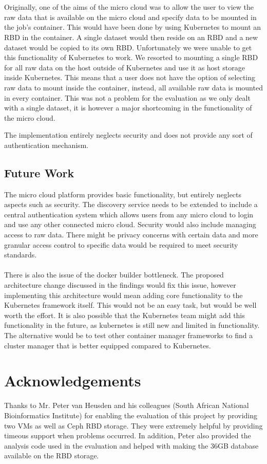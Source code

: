 \documentclass{sig-alternate-05-2015}
\begin{document}
\\\\
Originally, one of the aims of the micro cloud was to allow the user to view the raw data that is available
on the micro cloud and specify data to be mounted in the job's container. This would have been done by using Kubernetes to mount an RBD in the container. A single dataset would then reside on an RBD and a new dataset would be copied to its own RBD. Unfortunately we were unable to get this functionality of Kubernetes to work. We resorted to mounting a single RBD for all raw data on the host outside of Kubernetes and use it as host storage inside Kubernetes. This means that a user does not have the option of selecting raw data to mount inside the container, instead, all available raw data is mounted in every container. This was not a problem for the evaluation as we only dealt with a single dataset, it is however a major shortcoming in the functionality of the micro cloud. 



The implementation entirely neglects security and does not provide any sort of authentication mechanism.




\subsection{Future Work}
The micro cloud platform provides basic functionality, but entirely neglects aspects such as security. The discovery service needs to be extended to include a central authentication system which allows users from any micro cloud to login and use any other connected micro cloud. Security would also include managing access to raw data. There might be privacy concerns with certain data and more granular access control to specific data would be required to meet security standards.
\\\\
There is also the issue of the docker builder bottleneck. The proposed architecture change discussed in the findings would fix this issue, however implementing this architecture would mean adding core functionality to the Kubernetes framework itself. This would not be an easy task, but would be well worth the effort. It is also possible that the Kubernetes team might add this functionality in the future, as kubernetes is still new and limited in functionality. The alternative would be to test other container manager frameworks to find a cluster manager that is better equipped compared to Kubernetes.

\section{Acknowledgements}
Thanks to Mr. Peter van Heusden and his colleagues (South African National Bioinformatics Institute) for enabling the evaluation of this project by providing two VMs as well as Ceph RBD storage. They were extremely helpful by providing timeous support when problems occurred. In addition, Peter also provided the analysis code used in the evaluation and helped with making the 36GB database available on the RBD storage.
\\

 
\end{document}
